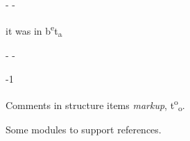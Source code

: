 \begin{description}\kern-\topsep
\makeatletter\advance\@topsepadd-\topsep\makeatother%
\item[{before 1.0}]{it was in b\textsuperscript{e}t\textsubscript{a}

}\end{description}%
\begin{description}\kern-\topsep
\makeatletter\advance\@topsepadd-\topsep\makeatother%
\item[{version}]{-1}\end{description}%
\label{Markup--val-foo}\begin{ocamlindent}Comments in structure items  \emph{markup}, t\textsuperscript{o}\textsubscript{o}.\end{ocamlindent}%
\medbreak
Some modules to support references.

\label{Markup--module-X}\label{Markup-X}\begin{ocamlindent}\end{ocamlindent}%
\\
\label{Markup--module-Y}\label{Markup-Y}\begin{ocamlindent}\end{ocamlindent}%
\\


